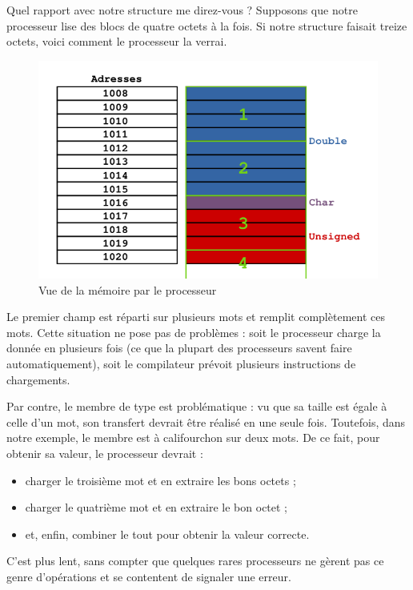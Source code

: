 Quel rapport avec notre structure me direz-vous ? Supposons que notre
processeur lise des blocs de quatre octets à la fois. Si notre structure
faisait treize octets, voici comment le processeur la verrai.

\begin{figure}[htbp]
\centering
\includegraphics[scale=0.5]{images/vue_memoire_proc.png}
\caption{Vue de la mémoire par le processeur}
\end{figure}

Le premier champ est réparti sur plusieurs mots et remplit complètement
ces mots. Cette situation ne pose pas de problèmes : soit le processeur
charge la donnée en plusieurs fois (ce que la plupart des processeurs
savent faire automatiquement), soit le compilateur prévoit plusieurs
instructions de chargements.

Par contre, le membre de type  est problématique :
vu que sa taille est égale à celle d'un mot, son transfert devrait être
réalisé en une seule fois. Toutefois, dans notre exemple, le membre est
à califourchon sur deux mots. De ce fait, pour obtenir sa valeur, le
processeur devrait :

\begin{itemize}
\item
  charger le troisième mot et en extraire les bons octets ;
\item
  charger le quatrième mot et en extraire le bon octet ;
\item
  et, enfin, combiner le tout pour obtenir la valeur correcte.
\end{itemize}

C'est plus lent, sans compter que quelques rares processeurs ne gèrent
pas ce genre d'opérations et se contentent de signaler une erreur.

